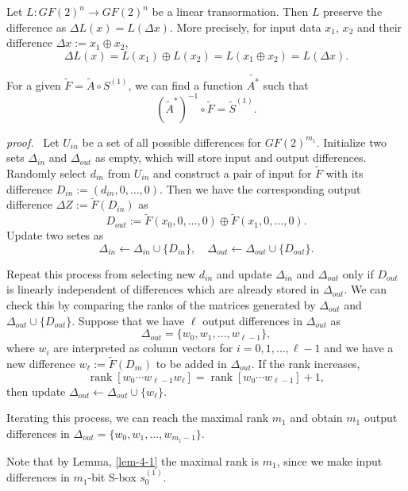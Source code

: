 \documentclass{ieeeaccess}
\newcommand{\rank}{\mathop{\mathrm{rank}}}
\begin{document}
\begin{lemma}\label{lem-4-2}
Let $L:GF(2)^n\to GF(2)^n$ be a linear transormation.
Then $L$ preserve the difference as $\Delta L(x) = L(\Delta x)$.
More precisely, for input data $x_1$, $x_2$ and their difference $\Delta x := x_1\oplus x_2$,
\[
\Delta L(x) = L(x_1) \oplus L(x_2) = 
L(x_1\oplus x_2) = L(\Delta x).
\]
\end{lemma}

\begin{theorem}\label{thm-4-2}
For a given $\tilde F = \tilde A \circ S^{(1)}$,
we can find a function $\tilde{A^*}$ such that
\[
(\tilde A^*)^{-1} \circ \tilde F = \tilde S^{(1)}.
\]
\end{theorem}

{\it proof.} \
Let $U_{in}$ be a set of all possible differences
for $GF(2)^{m_1}$.
Initialize two sets $\Delta_{in}$ and $\Delta_{out}$ as empty, which 
will store input and output differences.
Randomly select $d_{in}$ from $U_{in}$ and
construct a pair of input for $\tilde F$ with its difference $D_{in}:=(d_{in},0,\ldots, 0)$.
Then we have the corresponding output difference $\Delta Z:=\tilde F(D_{in})$  as
\[
D_{out} := \tilde F(x_0,0,\ldots, 0) \oplus \tilde F(x_1,0,\ldots, 0).
\]
Update two setes as
\[
\Delta_{in} \leftarrow \Delta_{in} \cup \{D_{in}\}, \quad
\Delta_{out} \leftarrow \Delta_{out} \cup \{D_{out}\}.
\]

Repeat this process from selecting new $d_{in}$ and
update $\Delta_{in}$ and $\Delta_{out}$ only if
$D_{out}$ is linearly independent of differences which are already stored in $\Delta_{out}$.
We can check this by comparing the ranks of the matrices generated by $\Delta_{out}$
and $\Delta_{out} \cup \{ D_{out} \}$.
Suppose that we have $\ell$ output differences in $\Delta_{out}$ as
\[
\Delta_{out} = \{ w_0, w_1, \ldots, w_{\ell-1} \},
\]
where $w_i$ are interpreted as column vectors for $i=0,1,\ldots, \ell-1$
and we have a new difference $w_{\ell}:=\tilde F(D_{in})$ to be added in $\Delta_{out}$.
If the rank increases, 
\[
\rank\left[  w_0 \cdots w_{\ell-1} w_{\ell} \right]
= \rank\left[  w_0 \cdots w_{\ell-1} \right] + 1,
\]
then update $\Delta_{out} \leftarrow \Delta_{out} \cup \{w_{\ell}\}$.

Iterating this process,
we can reach the maximal rank $m_1$ and
obtain $m_1$ output differences in 
$\Delta_{out} = \{ w_0, w_1, \ldots, w_{m_1-1} \}$.

Note that by Lemma, \ref{lem-4-1} the maximal rank is $m_1$,
since we make input differences in $m_1$-bit S-box $s_0^{(1)}$.
\end{document}

